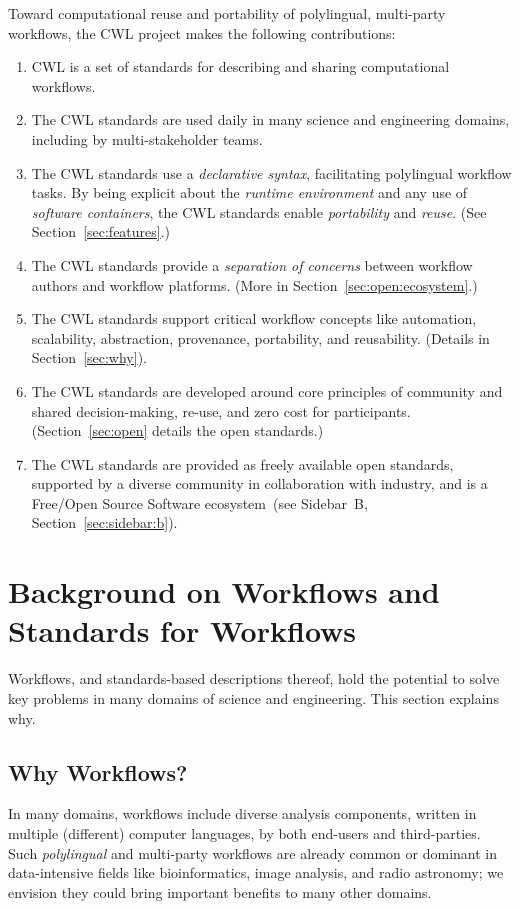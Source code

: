 Toward computational reuse and portability of polylingual, multi-party workflows, the CWL project makes the following contributions:

\begin{enumerate}
\item
  {CWL is a set of standards for describing and sharing computational workflows.}
\item
  {The CWL standards are used daily in many science and engineering domains, including by multi-stakeholder teams.}
\item
  {The CWL standards use a \textit{declarative syntax}, facilitating polylingual workflow tasks. By being explicit about the \textit{runtime environment} and any use of \textit{software containers}, the CWL standards enable \textit{portability} and \textit{reuse}. (See Section~\ref{sec:features}.)}
\item
  {The CWL standards provide a \textit{separation of concerns} between workflow authors and workflow platforms. (More in Section~\ref{sec:open:ecosystem}.)}
\item
  {The CWL standards support critical workflow concepts like automation, scalability, abstraction, provenance, portability, and reusability. (Details in Section~\ref{sec:why}).}
\item
  {The CWL standards are developed around core principles of community and shared decision-making, re-use, and zero cost for participants. (Section~\ref{sec:open} details the open standards.)}
\item
  {The CWL standards are provided as freely available open standards, supported by a diverse community in collaboration with industry, and is a Free/Open Source Software ecosystem~(see Sidebar~B, Section~\ref{sec:sidebar:b}).}
\end{enumerate}

\section{Background on Workflows and Standards for Workflows}\label{sec:bg}\label{sec:why}

Workflows, and standards-based descriptions thereof, hold the potential to solve key problems in many domains of science and engineering. This section explains why.

\subsection{Why Workflows?}\label{sec:bg:workflows}
In many domains, workflows include diverse analysis components, written in multiple (different) computer languages, by both end-users and third-parties. Such \emph{polylingual} and multi-party workflows are already common or dominant in data-intensive fields like bioinformatics, image analysis, and radio astronomy; we envision they could bring important benefits to many other domains.

